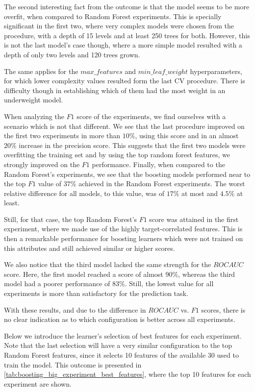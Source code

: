 The second interesting fact from the outcome is that the model seems to be more overfit, when compared to Random Forest experiments.
This is specially significant in the first two, where very complex models were chosen from the procedure, with a depth of 15 levels and at least 250 trees for both.
However, this is not the last model's case though, where a more simple model resulted with a depth of only two levels and 120 trees grown.

The same applies for the $max\_features$ and $min\_leaf\_weight$ hyperparameters, for which lower complexity values resulted form the last CV procedure.
There is difficulty though in establishing which of them had the most weight in an underweight model.

When analyzing the $F1$ score of the experiments, we find ourselves with a scenario which is not that different.
We see that the last procedure improved on the first two experiments in more than $10\%$, using this score and in an almost $20\%$ increase in the precision score.
This suggests that the first two models were overfitting the training set and by using the top random forest features, we strongly improved on the $F1$ performance.
Finally, when compared to the Random Forest's experiments, we see that the boosting models performed near to the top $F1$ value of $37\%$ achieved in the Random Forest experiments.
The worst relative difference for all models, to this value, was of $17\%$ at most and $4.5\%$ at least.

Still, for that case, the top Random Forest's $F1$ score was attained in the first experiment, where we made use of the highly target-correlated features.
This is then a remarkable performance for boosting learners which were not trained on this attributes and still achieved similar or higher scores.

We also notice that the third model lacked the same strength for the $ROC AUC$ score.
Here, the first model reached a score of almost $90\%$, whereas the third model had a poorer performance of $83\%$.
Still, the lowest value for all experiments is more than satisfactory for the prediction task.

With these results, and due to the difference in $ROC AUC$ vs. $F1$ scores, there is no clear indication as to which configuration is better across all experiments.

Below we introduce the learner's selection of best features for each experiment.
Note that the last selection will have a very similar configuration to the top Random Forest features, since it selects 10 features of the available 30 used to train the model.
This outcome is presented in \cref{tab:boosting_big_experiment_best_features}, where the top 10 features for each experiment are shown.


